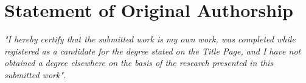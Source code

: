 \chapter{Statement of Original Authorship}

\vspace{4cm}

\textit{"I hereby certify that the submitted work is my own work, was completed while registered as a candidate for the degree stated on the Title Page, and I have not obtained a degree elsewhere on the basis of the research presented in this submitted work".}